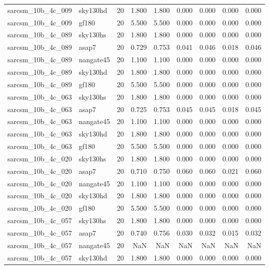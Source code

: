 \begin{tabular}{llrrrrrrr}
sarcsm\_10b\_4c\_009 & sky130hd & 20 & 1.800 & 1.800 & 0.000 & 0.000 & 0.000 & 0.000 \\
sarcsm\_10b\_4c\_009 & gf180 & 20 & 5.500 & 5.500 & 0.000 & 0.000 & 0.000 & 0.000 \\
sarcsm\_10b\_4c\_089 & sky130hs & 20 & 1.800 & 1.800 & 0.000 & 0.000 & 0.000 & 0.000 \\
sarcsm\_10b\_4c\_089 & asap7 & 20 & 0.729 & 0.753 & 0.041 & 0.046 & 0.018 & 0.046 \\
sarcsm\_10b\_4c\_089 & nangate45 & 20 & 1.100 & 1.100 & 0.000 & 0.000 & 0.000 & 0.000 \\
sarcsm\_10b\_4c\_089 & sky130hd & 20 & 1.800 & 1.800 & 0.000 & 0.000 & 0.000 & 0.000 \\
sarcsm\_10b\_4c\_089 & gf180 & 20 & 5.500 & 5.500 & 0.000 & 0.000 & 0.000 & 0.000 \\
sarcsm\_10b\_4c\_063 & sky130hs & 20 & 1.800 & 1.800 & 0.000 & 0.000 & 0.000 & 0.000 \\
sarcsm\_10b\_4c\_063 & asap7 & 20 & 0.725 & 0.753 & 0.045 & 0.045 & 0.018 & 0.045 \\
sarcsm\_10b\_4c\_063 & nangate45 & 20 & 1.100 & 1.100 & 0.000 & 0.000 & 0.000 & 0.000 \\
sarcsm\_10b\_4c\_063 & sky130hd & 20 & 1.800 & 1.800 & 0.000 & 0.000 & 0.000 & 0.000 \\
sarcsm\_10b\_4c\_063 & gf180 & 20 & 5.500 & 5.500 & 0.000 & 0.000 & 0.000 & 0.000 \\
sarcsm\_10b\_4c\_020 & sky130hs & 20 & 1.800 & 1.800 & 0.000 & 0.000 & 0.000 & 0.000 \\
sarcsm\_10b\_4c\_020 & asap7 & 20 & 0.710 & 0.750 & 0.060 & 0.060 & 0.021 & 0.060 \\
sarcsm\_10b\_4c\_020 & nangate45 & 20 & 1.100 & 1.100 & 0.000 & 0.000 & 0.000 & 0.000 \\
sarcsm\_10b\_4c\_020 & sky130hd & 20 & 1.800 & 1.800 & 0.000 & 0.000 & 0.000 & 0.000 \\
sarcsm\_10b\_4c\_020 & gf180 & 20 & 5.500 & 5.500 & 0.000 & 0.000 & 0.000 & 0.000 \\
sarcsm\_10b\_4c\_057 & sky130hs & 20 & 1.800 & 1.800 & 0.000 & 0.000 & 0.000 & 0.000 \\
sarcsm\_10b\_4c\_057 & asap7 & 20 & 0.740 & 0.756 & 0.030 & 0.032 & 0.015 & 0.032 \\
sarcsm\_10b\_4c\_057 & nangate45 & 20 & NaN & NaN & NaN & NaN & NaN & NaN \\
sarcsm\_10b\_4c\_057 & sky130hd & 20 & 1.800 & 1.800 & 0.000 & 0.000 & 0.000 & 0.000 \\

\end{tabular}
